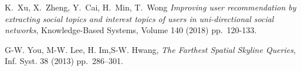 \documentclass[11pt,onecolumn]{elsart3p}
\begin{document}
\begin{thebibliography}{100}
K.~Xu, X.~Zheng, Y.~Cai, H.~Min, T.~Wong
\emph{Improving user recommendation by extracting social topics and interest topics of users in uni-directional social networks}, Knowledge-Based Systems, Volume 140 (2018) pp.~120-133.

G-W. You, M-W. Lee, H. Im,S-W. Hwang, \emph{The Farthest Spatial Skyline Queries}, Inf. Syst. 38 (2013) pp.~286--301.


\end{thebibliography}
\end{document}
